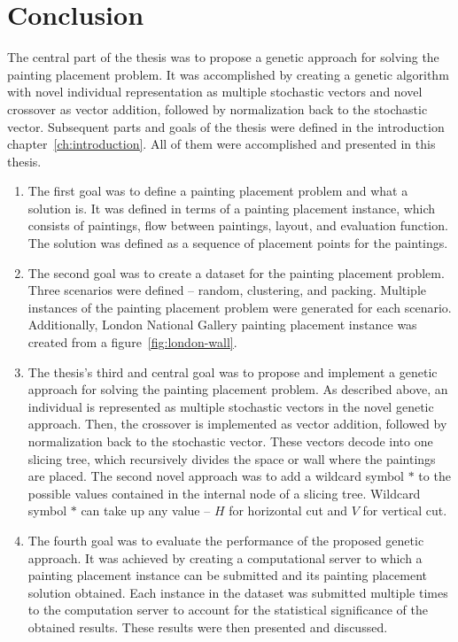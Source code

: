 \chapter{Conclusion}\label{ch:conclusion}

The central part of the thesis was to propose a genetic approach for solving the painting placement problem.
It was accomplished by creating a genetic algorithm with novel individual representation as multiple stochastic vectors
and novel crossover as vector addition, followed by normalization back to the stochastic vector.
Subsequent parts and goals of the thesis were defined in the introduction chapter~\ref{ch:introduction}.
All of them were accomplished and presented in this thesis.

\begin{enumerate}
    \item The first goal was to define a painting placement problem and what a solution is.
    It was defined in terms of a painting placement instance, which consists
    of paintings, flow between paintings, layout, and evaluation function.
    The solution was defined as a sequence of placement points for the paintings.

    \item  The second goal was to create a dataset for the painting placement problem.
    Three scenarios were defined – random, clustering, and packing.
    Multiple instances of the painting placement problem were generated for each scenario.
    Additionally, London National Gallery painting placement instance was created from a figure~\ref{fig:london-wall}.

    \item  The thesis's third and central goal was to propose and implement a genetic approach for solving the painting placement problem.
    As described above, an individual is represented as multiple stochastic vectors in the novel genetic approach.
    Then, the crossover is implemented as vector addition, followed by normalization back to the stochastic vector.
    These vectors decode into one slicing tree, which recursively divides the space or wall where the paintings are placed.
    The second novel approach was to add a wildcard symbol $*$ to the possible values contained in the internal node of a slicing tree.
    Wildcard symbol $*$ can take up any value – $H$ for horizontal cut and $V$ for vertical cut.

    \item  The fourth goal was to evaluate the performance of the proposed genetic approach.
    It was achieved by creating a computational server to which a painting placement
    instance can be submitted and its painting placement solution obtained.
    Each instance in the dataset was submitted multiple times to the computation server to account for the statistical significance of the obtained results.
    These results were then presented and discussed.


\end{enumerate}

